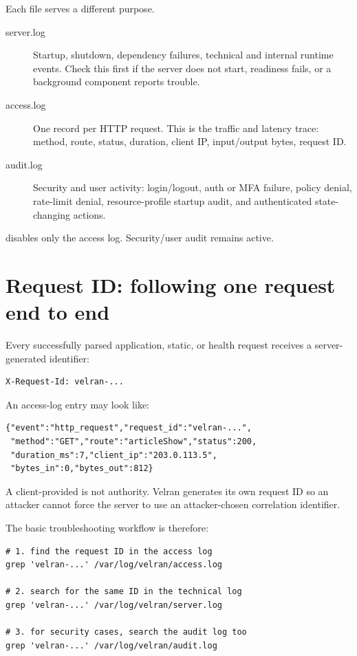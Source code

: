 Each file serves a different purpose.

\begin{description}
  \item[server.log] Startup, shutdown, dependency failures, technical and internal runtime events. Check this first if the server does not start, readiness fails, or a background component reports trouble.
  \item[access.log] One record per HTTP request. This is the traffic and latency trace: method, route, status, duration, client IP, input/output bytes, request ID.
  \item[audit.log] Security and user activity: login/logout, auth or MFA failure, policy denial, rate-limit denial, resource-profile startup audit, and authenticated state-changing actions.
\end{description}

 disables only the access log. Security/user audit remains active.

\section{Request ID: following one request end to end}

Every successfully parsed application, static, or health request receives a server-generated identifier:

\begin{lstlisting}
X-Request-Id: velran-...
\end{lstlisting}

An access-log entry may look like:

\begin{lstlisting}
{"event":"http_request","request_id":"velran-...",
 "method":"GET","route":"articleShow","status":200,
 "duration_ms":7,"client_ip":"203.0.113.5",
 "bytes_in":0,"bytes_out":812}
\end{lstlisting}

A client-provided  is not authority. Velran generates its own request ID so an attacker cannot force the server to use an attacker-chosen correlation identifier.

The basic troubleshooting workflow is therefore:

\begin{lstlisting}
# 1. find the request ID in the access log
grep 'velran-...' /var/log/velran/access.log

# 2. search for the same ID in the technical log
grep 'velran-...' /var/log/velran/server.log

# 3. for security cases, search the audit log too
grep 'velran-...' /var/log/velran/audit.log
\end{lstlisting}

